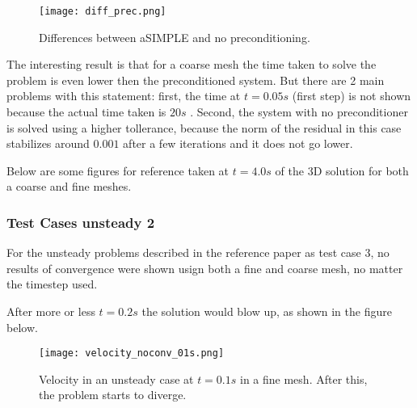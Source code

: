 \documentclass{article}
\begin{document}
\begin{figure}[h]
    \centering
    \texttt{[image: diff\_prec.png]}
    \caption{Differences between aSIMPLE and no preconditioning.}
\end{figure}

The interesting result is that for a coarse mesh the time taken to solve the problem is even lower then the preconditioned system. But there are 2 main problems with this statement: first, the time at \(t=0.05s\) (first step) is not shown because the actual time taken is \(20s\) . Second, the system with no preconditioner is solved using a higher tollerance, because the norm of the residual in this case stabilizes around \(0.001\) after a few iterations and it does not go lower.

Below are some figures for reference taken at \(t=4.0s\) of the 3D solution for both a coarse and fine meshes.

\begin{figure}[h]
    \centering
    
    \hfill
    
    \vspace{1em} %
    
    \hfill
\end{figure}
\newpage
\subsubsection{Test Cases unsteady 2}

For the unsteady problems described in the reference paper as test case 3, no results of convergence were shown usign both a fine and coarse mesh, no matter the timestep used.

After more or less \(t=0.2s\) the solution would blow up, as shown in the figure below.

\begin{figure}[H]
    \centering
    \texttt{[image: velocity\_noconv\_01s.png]}
    \caption{Velocity in an unsteady case at \(t=0.1s\) in a fine mesh. After this, the problem starts to diverge.}
\end{figure}
\end{document}
